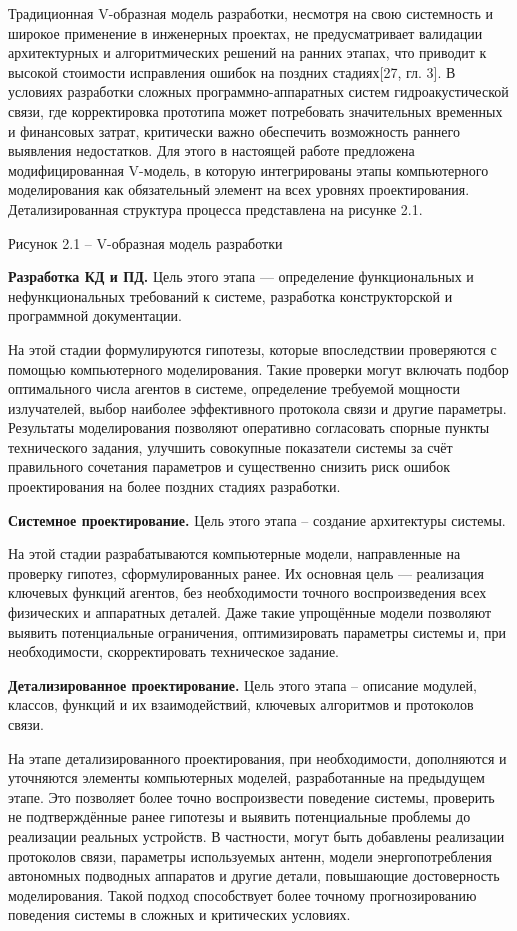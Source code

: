 Традиционная V-образная модель разработки, несмотря на свою системность
и широкое применение в инженерных проектах, не предусматривает валидации
архитектурных и алгоритмических решений на ранних этапах, что приводит к
высокой стоимости исправления ошибок на поздних стадиях{[}27, гл. 3{]}.
В условиях разработки сложных программно-аппаратных систем
гидроакустической связи, где корректировка прототипа может потребовать
значительных временных и финансовых затрат, критически важно обеспечить
возможность раннего выявления недостатков. Для этого в настоящей работе
предложена модифицированная V-модель, в которую интегрированы этапы
компьютерного моделирования как обязательный элемент на всех уровнях
проектирования. Детализированная структура процесса представлена на
рисунке 2.1.

Рисунок 2.1 -- V-образная модель разработки

\textbf{Разработка КД и ПД.} Цель этого этапа --- определение
функциональных и нефункциональных требований к системе, разработка
конструкторской и программной документации.

На этой стадии формулируются гипотезы, которые впоследствии проверяются
с помощью компьютерного моделирования. Такие проверки могут включать
подбор оптимального числа агентов в системе, определение требуемой
мощности излучателей, выбор наиболее эффективного протокола связи и
другие параметры. Результаты моделирования позволяют оперативно
согласовать спорные пункты технического задания, улучшить совокупные
показатели системы за счёт правильного сочетания параметров и
существенно снизить риск ошибок проектирования на более поздних стадиях
разработки.

\textbf{Системное проектирование.} Цель этого этапа -- создание
архитектуры системы.

На этой стадии разрабатываются компьютерные модели, направленные на
проверку гипотез, сформулированных ранее. Их основная цель ---
реализация ключевых функций агентов, без необходимости точного
воспроизведения всех физических и аппаратных деталей. Даже такие
упрощённые модели позволяют выявить потенциальные ограничения,
оптимизировать параметры системы и, при необходимости, скорректировать
техническое задание.

\textbf{Детализированное проектирование.} Цель этого этапа -- описание
модулей, классов, функций и их взаимодействий, ключевых алгоритмов и
протоколов связи.

На этапе детализированного проектирования, при необходимости,
дополняются и уточняются элементы компьютерных моделей, разработанные на
предыдущем этапе. Это позволяет более точно воспроизвести поведение
системы, проверить не подтверждённые ранее гипотезы и выявить
потенциальные проблемы до реализации реальных устройств. В частности,
могут быть добавлены реализации протоколов связи, параметры используемых
антенн, модели энергопотребления автономных подводных аппаратов и другие
детали, повышающие достоверность моделирования. Такой подход
способствует более точному прогнозированию поведения системы в сложных и
критических условиях.


